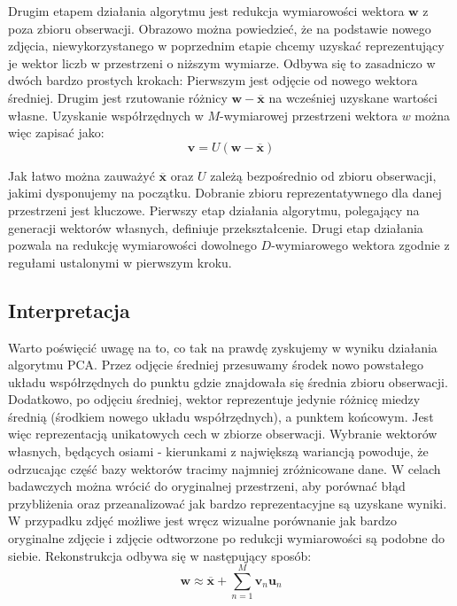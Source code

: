 \documentclass[oneside, eng]{mgr}
\newcommand{\bb}{\textbf}
\begin{document}
Drugim etapem działania algorytmu jest redukcja wymiarowości wektora $\bb{w}$ z poza zbioru obserwacji. Obrazowo można powiedzieć, że na podstawie nowego zdjęcia, niewykorzystanego w poprzednim etapie chcemy uzyskać reprezentujący je wektor liczb w przestrzeni o niższym wymiarze. Odbywa się to zasadniczo w dwóch bardzo prostych krokach: Pierwszym jest odjęcie od nowego wektora średniej. Drugim jest rzutowanie różnicy $\bb{w} - \overline{\bb{x}}$ na wcześniej uzyskane wartości własne. Uzyskanie współrzędnych w $M$-wymiarowej przestrzeni wektora $w$ można więc zapisać jako:
\begin{equation}
	\bb{v} = U ( \bb{w} - \overline{\bb{x}} ) 
\end{equation}

Jak łatwo można zauważyć $\overline{\bb{x}}$ oraz $U$ zależą bezpośrednio od zbioru obserwacji, jakimi dysponujemy na początku. Dobranie zbioru reprezentatywnego dla danej przestrzeni jest kluczowe. Pierwszy etap działania algorytmu, polegający na generacji wektorów własnych, definiuje przekształcenie. Drugi etap działania pozwala na redukcję wymiarowości dowolnego $D$-wymiarowego wektora zgodnie z regułami ustalonymi w pierwszym kroku.

\subsection{Interpretacja}
Warto poświęcić uwagę na to, co tak na prawdę zyskujemy w wyniku działania algorytmu PCA. Przez odjęcie średniej przesuwamy środek nowo powstałego układu współrzędnych do punktu gdzie znajdowała się średnia zbioru obserwacji. Dodatkowo, po odjęciu średniej, wektor reprezentuje jedynie różnicę miedzy średnią (środkiem nowego układu współrzędnych), a punktem końcowym. Jest więc reprezentacją unikatowych cech w zbiorze obserwacji. Wybranie wektorów własnych, będących osiami - kierunkami z największą wariancją powoduje, że odrzucając część bazy wektorów tracimy najmniej zróżnicowane dane. W celach badawczych można wrócić do oryginalnej przestrzeni, aby porównać błąd przybliżenia oraz przeanalizować jak bardzo reprezentacyjne są uzyskane wyniki. W przypadku zdjęć możliwe jest wręcz wizualne porównanie jak bardzo oryginalne zdjęcie i zdjęcie odtworzone po redukcji wymiarowości są podobne do siebie. Rekonstrukcja odbywa się w następujący sposób:
\begin{equation}
	\bb{w} \approx \overline{\bb{x}} + \sum_{n=1}^{M} \bb{v}_n \bb{u}_n
\end{equation}
\end{document}
